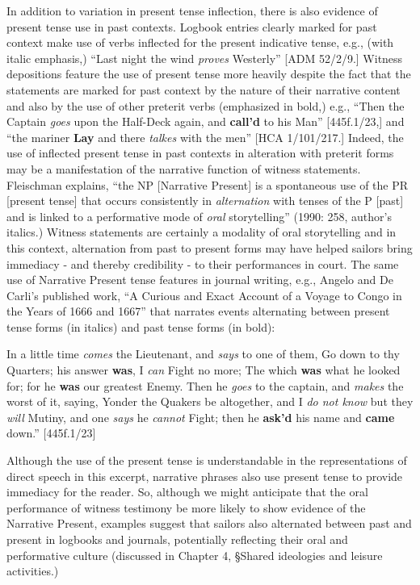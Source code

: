 \begin{styleStandard}
In addition to variation in present tense inflection, there is also evidence of present tense use in past contexts. Logbook entries clearly marked for past context make use of verbs inflected for the present indicative tense, e.g., (with italic emphasis,) “Last night the wind \textit{proves} Westerly” [ADM 52/2/9.] Witness depositions feature the use of present tense more heavily despite the fact that the statements are marked for past context by the nature of their narrative content and also by the use of other preterit verbs (emphasized in bold,) e.g., “Then the Captain \textit{goes} upon the Half-Deck again, and \textbf{call’d} to his Man” [445f.1/23,] and “the mariner \textbf{Lay} and there \textit{talkes} with the men” [HCA 1/101/217.] Indeed, the use of inflected present tense in past contexts in alteration with preterit forms may be a manifestation of the narrative function of witness statements. Fleischman explains, “the NP [Narrative Present] is a spontaneous use of the PR [present tense] that occurs consistently in \textit{alternation} with tenses of the P [past] and is linked to a performative mode of \textit{oral }storytelling” (1990: 258, author’s italics.) Witness statements are certainly a modality of oral storytelling and in this context, alternation from past to present forms may have helped sailors bring immediacy - and thereby credibility - to their performances in court. The same use of Narrative Present tense features in journal writing, e.g., Angelo and De Carli’s published work, “A Curious and Exact Account of a Voyage to Congo in the Years of 1666 and 1667” that narrates events alternating between present tense forms (in italics) and past tense forms (in bold):
\end{styleStandard}

\begin{styleStandard}
In a little time \textit{comes} the Lieutenant, and \textit{says} to one of them, Go down to thy Quarters; his answer \textbf{was}, I \textit{can} Fight no more; The which \textbf{was} what he looked for; for he \textbf{was} our greatest Enemy. Then he\textit{ goes} to the captain, and \textit{makes} the worst of it, saying, Yonder the Quakers be altogether, and I \textit{do not know} but they \textit{will }Mutiny, and one \textit{says} he \textit{cannot} Fight; then he \textbf{ask’d} his name and\textbf{ came} down.” [445f.1/23]
\end{styleStandard}

\begin{styleStandard}
Although the use of the present tense is understandable in the representations of direct speech in this excerpt, narrative phrases also use present tense to provide immediacy for the reader. So, although we might anticipate that the oral performance of witness testimony be more likely to show evidence of the Narrative Present, examples suggest that sailors also alternated between past and present in logbooks and journals, potentially reflecting their oral and performative culture (discussed in Chapter 4, §Shared ideologies and leisure activities.) 
\end{styleStandard}

